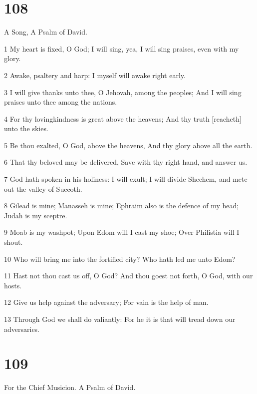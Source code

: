 \chapter{108}

\par A Song, A Psalm of David.

\par 1 My heart is fixed, O God; I will sing, yea, I will sing praises, even with my glory.
\par 2 Awake, psaltery and harp: I myself will awake right early.
\par 3 I will give thanks unto thee, O Jehovah, among the peoples; And I will sing praises unto thee among the nations.
\par 4 For thy lovingkindness is great above the heavens; And thy truth [reacheth] unto the skies.
\par 5 Be thou exalted, O God, above the heavens, And thy glory above all the earth.
\par 6 That thy beloved may be delivered, Save with thy right hand, and answer us.
\par 7 God hath spoken in his holiness: I will exult; I will divide Shechem, and mete out the valley of Succoth.
\par 8 Gilead is mine; Manasseh is mine; Ephraim also is the defence of my head; Judah is my sceptre.
\par 9 Moab is my washpot; Upon Edom will I cast my shoe; Over Philistia will I shout.
\par 10 Who will bring me into the fortified city? Who hath led me unto Edom?
\par 11 Hast not thou cast us off, O God? And thou goest not forth, O God, with our hosts.
\par 12 Give us help against the adversary; For vain is the help of man.
\par 13 Through God we shall do valiantly: For he it is that will tread down our adversaries.

\chapter{109}

\par For the Chief Musicion. A Psalm of David.

